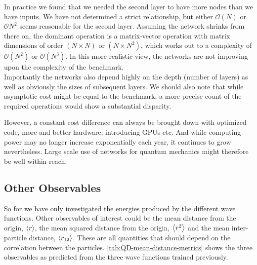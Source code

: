 \documentclass[Thesis.tex]{subfiles}
\begin{document}
In practice we found that we needed the second layer to have more
nodes than we have inputs. We have not determined a strict relationship, but
either $\mathcal{O}(N)$ or $\mathcal{O}{N^2}$ seems reasonable for the second
layer. Assuming the network shrinks from there on, the dominant operation is a
matrix-vector operation with matrix dimensions of order $(N\times N)$ or $(N\times N^2)$,
which works out to a complexity of $\mathcal{O}(N^2)$ or $\mathcal{O}(N^3)$. In
this more realistic view, the networks are not improving upon the complexity of
the benchmark.\\

Importantly the networks also depend highly on the depth (number of layers) as
well as obviously the sizes of subsequent layers. We should also note that while
asymptotic cost might be equal to the benchmark, a more precise count of the
required operations would show a substantial disparity.

However, a constant cost difference can always be brought down with optimized code, more
and better hardware, introducing GPUs etc. And while computing power may no
longer increase exponentially each year, it continues to grow nevertheless.
Large scale use of networks for quantum mechanics might therefore be well
within reach.

\subsection{Other Observables}

So for we have only investigated the energies produced by the different wave
functions. Other observables of interest could be the mean distance from the origin,
$\expval{r}$, the mean squared distance from the origin, $\expval{r^2}$ and the mean
inter-particle distance, $\expval{r_{12}}$. These are all quantities that should
depend on the correlation between the particles.
\cref{tab:QD-mean-distance-metrics} shows the three observables as predicted
from the three wave functions trained previously. 
\end{document}
